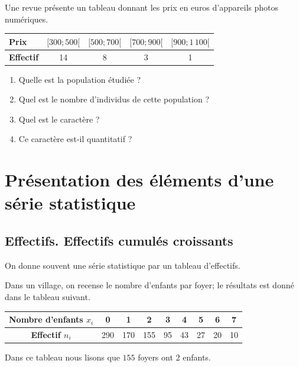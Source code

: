 \begin{example}
Une revue présente un tableau donnant les prix en euros d'appareils photos numériques.

  \begin{center}

    \begin{tabular}[t]{|l|c|c|c|c|}
      \hline
      \textbf{Prix} & $[300;500[$ & $[500;700[$ & $[700;900[$ &
      $[900;1\,100[$ \\
      \hline
      \textbf{Effectif} & 14 & 8 & 3 & 1 \\
      \hline
    \end{tabular}
      
  \end{center}

  \begin{enumerate}
  \item Quelle est la population étudiée ? \\[1ex]
  \item Quel est le nombre d'individus de cette population ?\\[1ex]
  \item Quel est le caractère ? \\[1ex]
  \item Ce caractère est-il quantitatif ?
  \end{enumerate}
  
\end{example}


\section{Présentation des éléments d'une série statistique}

\subsection{Effectifs. Effectifs cumulés croissants}

On donne souvent une série statistique par un tableau d'effectifs.

\begin{example} \label{ExUDXDZl}
Dans un village, on recense le nombre d'enfants par foyer; le résultats est donné dans le tableau suivant.

\begin{center}
\begin{tabular}[h]{|c|c|c|c|c|c|c|c|c|}
    \hline
  \textbf{Nombre d'enfants $x_i$} & 0 & 1 & 2 & 3 & 4 & 5 & 6 & 7 \\
  \hline
  \textbf{Effectif $n_i$} & 290 & 170 & 155 & 95 & 43 & 27 & 20 & 10\\
  \hline
\end{tabular}
\end{center}

Dans ce tableau nous lisons que \( 155\) foyers ont 2 enfants.
    
\end{example}

